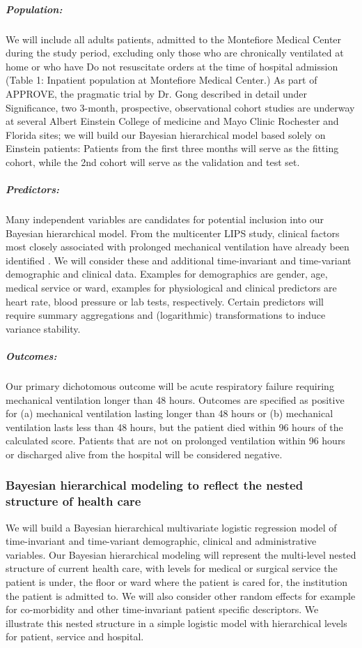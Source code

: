 \documentclass[11pt,notitlepage]{article}
\begin{document}
\subparagraph*{Population:}
We will include all adults patients, admitted to the Montefiore Medical Center during the study period, excluding only those who are chronically ventilated at home or who have Do not resuscitate orders at the time of hospital admission (Table 1: Inpatient population at Montefiore Medical Center.) As part of APPROVE, the pragmatic trial by Dr. Gong described in detail under Significance, two 3-month, prospective, observational cohort studies are underway at several Albert Einstein College of medicine and Mayo Clinic Rochester and Florida sites; we will build our Bayesian hierarchical model based solely on Einstein patients: Patients from the first three months will serve as the fitting cohort, while the 2nd cohort will serve as the validation and test set.  

\subparagraph*{Predictors:}
Many independent variables are candidates for potential inclusion into our Bayesian hierarchical model. From the multicenter LIPS study, clinical factors most closely associated with prolonged mechanical ventilation have already been identified \cite{Herridge_12594312}. We will consider these and additional time-invariant and time-variant demographic and clinical data. Examples for demographics are gender, age, medical service or ward, examples for physiological and clinical predictors are heart rate, blood pressure or lab tests, respectively. Certain predictors will require summary aggregations and (logarithmic) transformations to induce variance stability.

\subparagraph*{Outcomes:}
Our primary dichotomous outcome will be acute respiratory failure requiring mechanical ventilation longer than 48 hours. Outcomes are specified as positive for (a) mechanical ventilation lasting longer than 48 hours or (b) mechanical ventilation lasts less than 48 hours, but the patient died within 96 hours of the calculated score. Patients that are not on prolonged ventilation within 96 hours or discharged alive from the hospital will be considered negative.


\subsubsection*{Bayesian hierarchical modeling to reflect the nested structure of health care}   
We will build a Bayesian hierarchical multivariate logistic regression model of time-invariant and time-variant demographic, clinical and administrative variables. Our Bayesian hierarchical modeling will represent the multi-level nested structure of current health care, with levels for medical or surgical service the patient is under, the floor or ward where the patient is cared for, the institution the patient is admitted to. We will also consider other random effects for example for co-morbidity and other time-invariant patient specific descriptors. We illustrate this nested structure in a simple logistic model with hierarchical levels for patient, service and hospital. 
\end{document}
